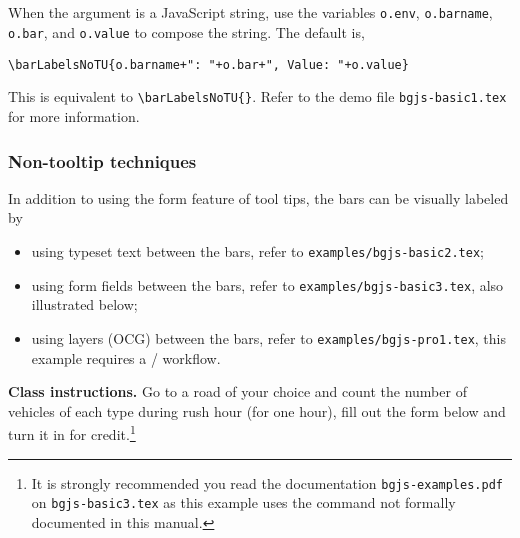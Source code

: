 \documentclass{article}
\edef\amtIndent{\the\parindent}
\begin{document}
\subparagraph*{} When the argument is a JavaScript string,
    use the variables \texttt{o.env}, \texttt{o.barname}, \texttt{o.bar}, and
    \texttt{o.value} to compose the string. The default is,
\begin{Verbatim}[xleftmargin=\amtIndent,fontsize=\small]
\barLabelsNoTU{o.barname+": "+o.bar+", Value: "+o.value}
\end{Verbatim}
This is equivalent to \verb|\barLabelsNoTU{}|. Refer to the demo file
\texttt{bgjs-basic1.tex} for more information.

\subsubsection{Non-tooltip techniques}

In addition to using the {\PDF} form feature of tool tips, the bars can be visually labeled by
\begin{itemize}
  \item using typeset text between the bars, refer to \texttt{examples/bgjs-basic2.tex};
  \item using form fields between the bars, refer to \texttt{examples/bgjs-basic3.tex}, also illustrated below;
  \item using layers (OCG) between the bars, refer to \texttt{examples/bgjs-pro1.tex}, this example
    requires a /\allowbreak{} workflow.
\end{itemize}\par\vcgBdry

\textbf{Class instructions.} Go to a road of your choice and count the number
of vehicles of each type during rush hour (for one hour), fill out the form
below and turn it in for credit.\footnote{It is strongly recommended you read the documentation
\texttt{bgjs-examples.pdf} on \texttt{bgjs-basic3.tex} as this example uses the
command  not formally documented in this manual.}\vcgBdry[6bp]
\end{document}
